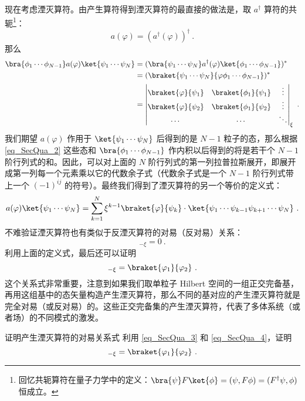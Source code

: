 现在考虑湮灭算符。由产生算符得到湮灭算符的最直接的做法是，取 $a^\dagger$ 算符的共轭\footnote{回忆共轭算符在量子力学中的定义：$\bra{\psi}F\ket{\phi}=(\psi,F \phi)=(F^\dagger \psi,\phi)$ 恒成立。}：
\begin{equation}\label{eq_SecQua_7}
a(\varphi)=(a^\dagger(\varphi))^\dagger~.
\end{equation}
那么
\begin{equation}\label{eq_SecQua_4}
\begin{aligned}
\bra{\phi_1\cdots\phi_{N-1}} a(\varphi) \ket{\psi_1\cdots\psi_{N}}&=(\bra{\psi_1\cdots\psi_{N}}a^\dagger(\varphi)\ket{\phi_1\cdots\phi_{N-1}})^*\\
&=(\braket{\psi_1\cdots\psi_{N}}{\varphi\phi_1\cdots\phi_{N-1}})^*\\
&=\left|
\begin{matrix}
\braket{\varphi}{\psi_1} & \braket{\phi_1}{\psi_1} & \vdots\\
\braket{\varphi}{\psi_2} & \braket{\phi_1}{\psi_2} & \vdots\\
\cdots & \cdots & \ddots
\end{matrix}
\right|_{\xi}~.
\end{aligned}
\end{equation}
我们期望 $a(\varphi)$ 作用于 $\ket{\psi_1\cdots\psi_N}$ 后得到的是 $N-1$ 粒子的态，那么根据\autoref{eq_SecQua_2} 这些态和 $\bra{\phi_1\cdots\phi_{N-1}}$ 作内积以后得到的将是若干个 $N-1$ 阶行列式的和。因此，可以对上面的 $N$ 阶行列式的第一列拉普拉斯展开，即展开成第一列每一个元素乘以它的代数余子式（代数余子式是一个 $N-1$ 阶行列式带上一个 $(-1)^{ij}$ 的符号）。最终我们得到了湮灭算符的另一个等价的定义式：
\begin{equation}\label{eq_SecQua_5}
a(\varphi)\ket{\psi_1\cdots\psi_N}=\sum_{k=1}^N \xi^{k-1} \braket{\varphi}{\psi_k} \cdot\ket{\psi_1\cdots\psi_{k-1}\psi_{k+1}\cdots \psi_N}~.
\end{equation}
不难验证湮灭算符也有类似于反湮灭算符的对易（反对易）关系：
\begin{equation}
[a(\varphi_1),a(\varphi_2)]_{-\xi}=0~.
\end{equation}
利用上面的定义式，最后还可以证明
\begin{equation}
[a(\varphi_1),a^\dagger(\varphi_2)]_{-\xi}=\braket{\varphi_1}{\varphi_2}~.
\end{equation}
这个关系式非常重要，注意到如果我们取单粒子 Hilbert 空间的一组正交完备基，再用这组基中的态矢量构造产生湮灭算符，那么不同的基对应的产生湮灭算符就是完全对易（或反对易）的。这些正交完备集的产生湮灭算符，代表了多体系统（或者场）的不同模式的激发。
\begin{exercise}{证明产生湮灭算符的对易关系式}
利用 \autoref{eq_SecQua_3} 和 \autoref{eq_SecQua_4}，证明
\begin{equation}
[a(\varphi_1),a^\dagger(\varphi_2)]_{-\xi}=\braket{\varphi_1}{\varphi_2}~.
\end{equation}
\end{exercise}
